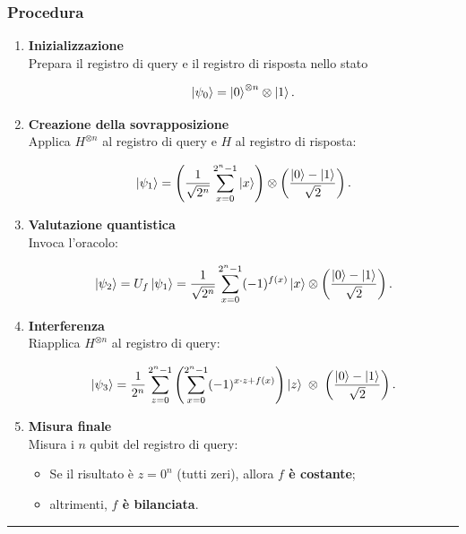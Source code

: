 \documentclass[a4paper,12pt]{report}
\theoremstyle{plain}
\begin{document}
\subsubsection*{Procedura}
\begin{enumerate}
    \item \textbf{Inizializzazione} \\
    Prepara il registro di query e il registro di risposta nello stato
    
    \[
    \ket{\psi_0} = \ket{0}^{\otimes n} \otimes \ket{1}.
    \]
    
    \item \textbf{Creazione della sovrapposizione} \\
    Applica $H^{\otimes n}$ al registro di query e $H$ al registro di risposta:
    
    \[
    \ket{\psi_1}
    = \left(\frac{1}{\sqrt{2^n}}\sum_{x=0}^{2^n-1}\ket{x}\right)
      \otimes
      \left(\frac{\ket{0} - \ket{1}}{\sqrt{2}}\right).
    \]
    
    \item \textbf{Valutazione quantistica} \\
    Invoca l'oracolo:
    
    \[
    \ket{\psi_2}
    = U_f\ket{\psi_1}
    = \frac{1}{\sqrt{2^n}}
      \sum_{x=0}^{2^n-1}(-1)^{f(x)}\ket{x}
      \otimes
      \left(\frac{\ket{0} - \ket{1}}{\sqrt{2}}\right).
    \]
    
    \item \textbf{Interferenza} \\
    Riapplica $H^{\otimes n}$ al registro di query:
    
    \[
    \ket{\psi_3}
    = \frac{1}{2^n}
      \sum_{z=0}^{2^n-1}
      \left(\sum_{x=0}^{2^n-1}(-1)^{x\cdot z + f(x)}\right)
      \ket{z}
      \;\otimes\;
      \left(\frac{\ket{0} - \ket{1}}{\sqrt{2}}\right).
    \]
    
    \item \textbf{Misura finale} \\
    Misura i $n$ qubit del registro di query:
    
    \begin{itemize}
        \item Se il risultato è $z=0^n$ (tutti zeri), allora \textbf{$f$ è costante};
        \item altrimenti, \textbf{$f$ è bilanciata}.
    \end{itemize}
\end{enumerate}
\vspace{0.5em}\hrule\vspace{0.5em}
\end{document}
